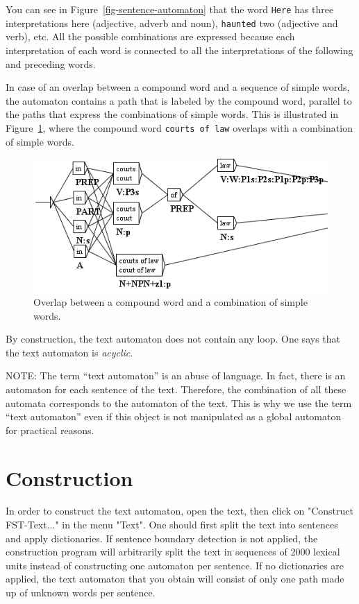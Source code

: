 \bigskip
\noindent You can see in Figure~\ref{fig-sentence-automaton}
that the word \verb+Here+ has three interpretations here (adjective, adverb and noun),
\verb+haunted+ two (adjective and verb), etc. All the possible combinations are
expressed because each interpretation of each word is connected to all the
interpretations of the following and preceding words.

\bigskip
\noindent In case of an overlap between a compound word and a sequence of simple words,
the automaton contains a path that is labeled by the compound word, parallel to
the paths that express the combinations of simple words. This is illustrated in
Figure~\ref{fig-overlap}, where the compound word
\texttt{courts of law} overlaps with a combination of simple words.

\begin{figure}[!ht]
\begin{center}
\includegraphics[width=12.5cm]{resources/img/fig7-2.png}
\caption{Overlap between a compound word and a combination of simple
words.\label{fig-overlap}}
\end{center}
\end{figure}

\bigskip
\noindent By construction, the text automaton does not contain any
loop. One says that the text automaton is \textit{acyclic}.

\bigskip
\noindent NOTE: The term ``text automaton'' is an abuse of language. In fact, there is an
automaton for each sentence of the text. Therefore, the combination of all these 
automata corresponds to the automaton
of the text. This is why we use the term ``text automaton'' even if this object
is not manipulated as a global automaton for practical reasons.

\section{Construction}
\label{construction-text-automaton}
In order to construct the text automaton, open the text, then click on 
"Construct FST-Text..." in the menu "Text". One should first split the text into
sentences and  apply dictionaries. If sentence boundary detection
is not applied, the construction program will arbitrarily split the text in
sequences of 2000 lexical units instead of constructing one automaton per
sentence. If no dictionaries are applied, the text automaton that you
obtain will consist of only one path made up of unknown words per sentence.



